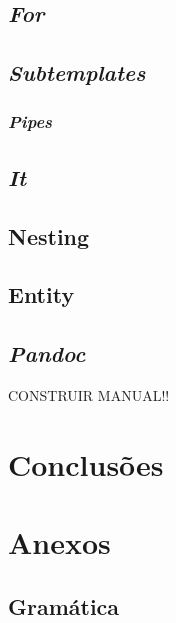\documentclass[11pt]{report}
\begin{document}
\section{\textit{For}}\label{subsec:For}


\section{\textit{Subtemplates}} \label{subsec:subt}


\subsection{\textit{Pipes}} \label{subsec:pipes}


\section{\textit{It}}\label{subsec:it}


\section{Nesting}
 \label{subsec:nest}

\section{Entity}
 \label{subsec:entity}

\section{\textit{Pandoc}}
CONSTRUIR MANUAL!!

\chapter{Conclusões}



\chapter{Anexos}\label{sec:anexos}

\section{Gramática} \label{fig:grammar}
\inputminted{bash}{assets/gramatica.txt}
\end{document}
